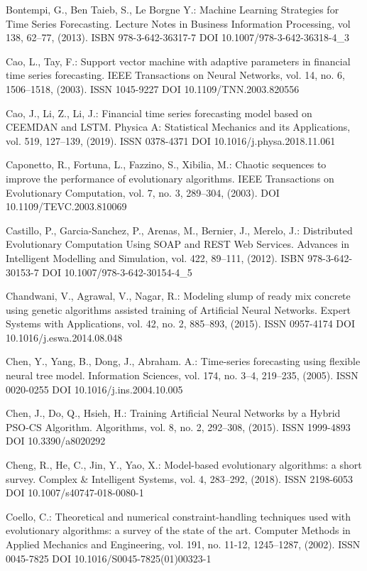 \begin{thebibliography}{99.}
 Bontempi, G., Ben Taieb, S., Le Borgne Y.: Machine Learning Strategies for Time Series Forecasting. Lecture Notes in Business Information Processing, vol 138, 62--77, (2013). ISBN 978-3-642-36317-7 DOI 10.1007/978-3-642-36318-4\_3

 Cao, L., Tay, F.: Support vector machine with adaptive parameters in financial time series forecasting. IEEE Transactions on Neural Networks, vol. 14, no. 6, 1506--1518, (2003). ISSN 1045-9227 DOI 10.1109/TNN.2003.820556

 Cao, J., Li, Z., Li, J.: Financial time series forecasting model based on CEEMDAN and LSTM. Physica A: Statistical Mechanics and its Applications, vol. 519, 127--139, (2019). ISSN 0378-4371 DOI 10.1016/j.physa.2018.11.061

 Caponetto, R., Fortuna, L., Fazzino, S., Xibilia, M.: Chaotic sequences to improve the performance of evolutionary algorithms. IEEE Transactions on Evolutionary Computation, vol. 7, no. 3, 289--304, (2003). DOI 10.1109/TEVC.2003.810069

 Castillo, P., Garcia-Sanchez, P., Arenas, M., Bernier, J., Merelo, J.: Distributed Evolutionary Computation Using SOAP and REST Web Services. Advances in Intelligent Modelling and Simulation, vol. 422, 89--111, (2012). ISBN 978-3-642-30153-7 DOI 10.1007/978-3-642-30154-4\_5

 Chandwani, V., Agrawal, V., Nagar, R.: Modeling slump of ready mix concrete using genetic algorithms assisted training of Artificial Neural Networks. Expert Systems with Applications, vol. 42, no. 2, 885--893, (2015). ISSN 0957-4174 DOI 10.1016/j.eswa.2014.08.048

 Chen, Y., Yang, B., Dong, J., Abraham. A.: Time-series forecasting using flexible neural tree model. Information Sciences, vol. 174, no. 3--4, 219--235, (2005). ISSN 0020-0255 DOI 10.1016/j.ins.2004.10.005

 Chen, J., Do, Q., Hsieh, H.: Training Artificial Neural Networks by a Hybrid PSO-CS Algorithm. Algorithms, vol. 8, no. 2, 292--308, (2015). ISSN 1999-4893 DOI 10.3390/a8020292

 Cheng, R., He, C., Jin, Y., Yao, X.: Model-based evolutionary algorithms: a short survey. Complex \& Intelligent Systems, vol. 4, 283--292, (2018). ISSN 2198-6053 DOI 10.1007/s40747-018-0080-1

 Coello, C.: Theoretical and numerical constraint-handling techniques used with evolutionary algorithms: a survey of the state of the art. Computer Methods in Applied Mechanics and Engineering, vol. 191, no. 11-12, 1245--1287, (2002). ISSN 0045-7825 DOI 10.1016/S0045-7825(01)00323-1


\end{thebibliography}
